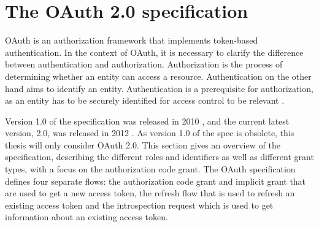 \clearpage
\section{The OAuth 2.0 specification}
OAuth is an authorization framework that implements token-based authentication.
In the context of OAuth, it is necessary to clarify the difference between authentication and authorization.
Authorization is the process of determining whether an entity can access a resource.
Authentication on the other hand aims to identify an entity.
Authentication is a prerequisite for authorization, as an entity has to be securely identified for access control to be relevant \citep{kim_authentication_2017}.

Version 1.0 of the specification was released in 2010 \citep{hammer-lahav_oauth_2010}, and the current latest version, 2.0, was released in 2012 \citep{hardt_oauth_2012}.
As version 1.0 of the spec is obsolete, this thesis will only consider OAuth 2.0.
This section gives an overview of the specification, describing the different roles and identifiers as well as different grant types, with a focus on the authorization code grant.
The OAuth specification defines four separate flows: the authorization code grant and implicit grant that are used to get a new access token, the refresh flow that is used to refresh an existing access token and the introspection request which is used to get information about an existing access token.



